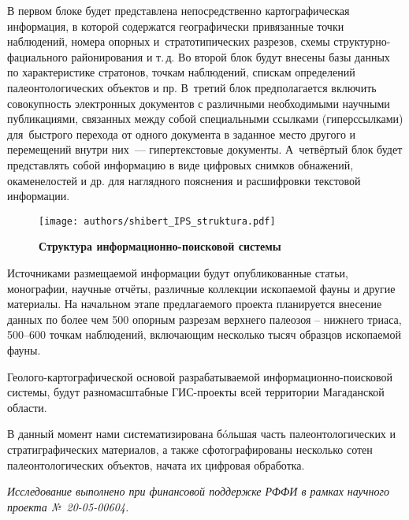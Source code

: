 В первом блоке будет представлена непосредственно картографическая информация, в которой содержатся географически привязанные точки наблюдений, номера опорных и~стратотипических разрезов, схемы структурно-фациального районирования и т.\,д. Во второй блок будут внесены базы данных по характеристике стратонов, точкам наблюдений, спискам определений палеонтологических объектов и пр. В~третий блок предполагается включить совокупность электронных документов с различными необходимыми научными публикациями, связанных между собой специальными ссылками (гиперссылками) для~быстрого перехода от одного документа в заданное место другого и перемещений внутри них~--- гипертекстовые документы. А~четвёртый блок будет представлять собой информацию в виде цифровых снимков обнажений, окаменелостей и др. для наглядного пояснения и расшифровки текстовой информации.\enlargethispage{\baselineskip}

\begin{figure}[H]
  \centering
  \texttt{[image: authors/shibert\_IPS\_struktura.pdf]}
  \caption*{\textbf{Структура информационно-поисковой системы}}
  \label{fig:shibert_IPS_struktura.pdf}
\end{figure}



Источниками размещаемой информации будут опубликованные статьи, монографии, научные отчёты, различные коллекции ископаемой фауны и другие материалы. На начальном этапе предлагаемого проекта планируется внесение данных по более чем 500 опорным разрезам верхнего палеозоя -- нижнего триаса, 500--600 точкам наблюдений, включающим несколько тысяч образцов ископаемой фауны.

Геолого-картографической основой разрабатываемой информационно-поисковой системы, будут разномасштабные ГИС-проекты всей территории Магаданской области.

В данный момент нами систематизирована бóльшая часть палеонтологических и стратиграфических материалов, а также сфотографированы несколько сотен палеонтологических объектов, начата их цифровая обработка.

\textit{Исследование выполнено при финансовой поддержке РФФИ в рамках научного проекта №~20-05-00604.}


